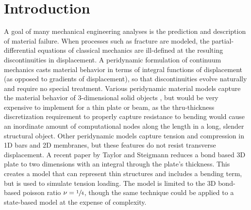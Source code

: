 \documentclass[5p,twocolumn]{elsarticle}
\begin{document}
\section{Introduction}
A goal of many mechanical engineering analyses is the prediction and description of material failure.
When processes such as fracture are modeled, the partial-differential equations of classical mechanics are ill-defined at the resulting discontinuities in displacement.  
A peridynamic formulation of continuum mechanics casts material behavior in terms of integral functions of displacement (as opposed to gradients of displacement), so that discontinuities evolve naturally and require no special treatment.  
Various peridynamic material models capture the material behavior of 3-dimensional solid objects \cite{silling2007peridynamic, silling2005meshfree, gerstle2007peridynamic}, but would be very expensive to implement for a thin plate or beam, as the thru-thickness discretization requirement to properly capture resistance to bending would cause an inordinate amount of computational nodes along the length in a long, slender structural object.  
Other peridynamic models capture tension and compression in 1D bars\cite{silling2003deformation} and 2D membranes\cite{silling2005peridynamic}, but these features do not resist transverse displacement.  
A recent paper by Taylor and Steigmann \cite{taylor2013two} reduces a bond based 3D plate to two dimensions with an integral through the plate's thickness. 
This creates a model that can represent thin structures and includes a bending term, but is used to simulate tension loading. 
The model is limited to the 3D bond-based poisson ratio \(\nu=\sfrac{1}{4}\), though the same technique could be applied to a state-based model at the expense of complexity.
\end{document}
